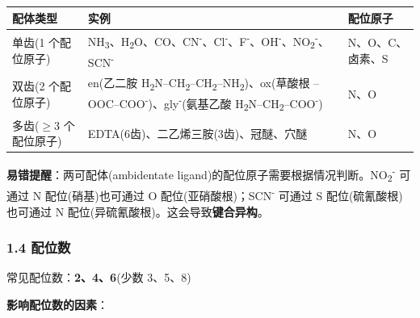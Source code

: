 \documentclass[a4paper,11pt]{ctexart}
\newcounter{none}
\newcommand{\箭}{\ensuremath{\rightarrow}}
\newcommand{\左箭}{\ensuremath{\leftarrow}}
\newcommand{\上箭}{\ensuremath{\uparrow}}
\newcommand{\下箭}{\ensuremath{\downarrow}}
\newcommand{\衡}{\ensuremath{\rightleftharpoons}}
\newcommand{\双箭}{\ensuremath{\leftrightarrow}}
\newcommand{\约等于}{\ensuremath{\approx}}
\newcommand{\小于等于}{\ensuremath{\leq}}
\newcommand{\大于等于}{\ensuremath{\geq}}
\newcommand{\不等于}{\ensuremath{\neq}}
\newcommand{\西格马}{\ensuremath{\sigma}}
\newcommand{\派}{\ensuremath{\pi}}
\begin{document}
{\def\LTcaptype{none} %
\begin{longtable}[]{@{}
  >{\raggedright\arraybackslash}p{}
  >{\raggedright\arraybackslash}p{}
  >{\centering\arraybackslash}p{}@{}}
\toprule\noalign{}
\begin{minipage}[b]{\linewidth}\raggedright
配体类型
\end{minipage} & \begin{minipage}[b]{\linewidth}\raggedright
实例
\end{minipage} & \begin{minipage}[b]{\linewidth}\centering
配位原子
\end{minipage} \\
\midrule\noalign{}
\endhead
\bottomrule\noalign{}
\endlastfoot
单齿(1 个配位原子) & NH\textsubscript{3}、H\textsubscript{2}O、CO、CN\textsuperscript{-}、Cl\textsuperscript{-}、F\textsuperscript{-}、OH\textsuperscript{-}、NO\textsubscript{2}\textsuperscript{-}、SCN\textsuperscript{-} & N、O、C、卤素、S \\
双齿(2 个配位原子) & en(乙二胺 H\textsubscript{2}N--CH\textsubscript{2}--CH\textsubscript{2}--NH\textsubscript{2})、ox(草酸根 --OOC--COO\textsuperscript{-})、gly\textsuperscript{-}(氨基乙酸 H\textsubscript{2}N--CH\textsubscript{2}--COO\textsuperscript{-}) & N、O \\
多齿(\大于等于3 个配位原子) & EDTA(6齿)、二乙烯三胺(3齿)、冠醚、穴醚 & N、O \\
\end{longtable}
}

\textbf{易错提醒}：两可配体(ambidentate ligand)的配位原子需要根据情况判断。NO\textsubscript{2}\textsuperscript{-} 可通过 N 配位(硝基)也可通过 O 配位(亚硝酸根)；SCN\textsuperscript{-} 可通过 S 配位(硫氰酸根)也可通过 N 配位(异硫氰酸根)。这会导致\textbf{键合异构}。

\subsubsection{1.4 配位数}\label{ux914dux4f4dux6570}

常见配位数：\textbf{2、4、6}(少数 3、5、8)

\textbf{影响配位数的因素}：
\end{document}
